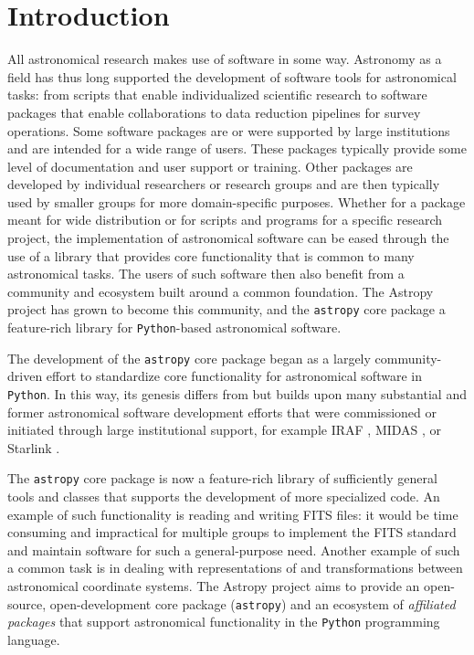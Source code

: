 \documentclass[modern]{aastex61}
\newcommand{\package}[1]{\texttt{#1}\xspace}
\newcommand{\python}{\package{Python}}
\newcommand{\astropy}{Astropy\xspace}
\newcommand{\astropypkg}{\package{astropy}}
\begin{document}
\section{Introduction} \label{sec:intro}
All astronomical research makes use of software in some way.  Astronomy as a field has thus long supported the development of software tools
for astronomical tasks: from scripts that enable individualized scientific research to software packages that enable collaborations to data reduction pipelines for survey operations.
Some software packages are or were supported by large institutions and are intended for a wide range of users. These packages typically provide some level of documentation and user support or
training.
Other packages are developed by individual researchers or research groups and
are then typically used by smaller groups for more domain-specific purposes.
Whether for a package meant for wide distribution or for scripts and programs
for a specific research project, the implementation of astronomical software can
be eased through the use of a library that provides core functionality that is
common to many astronomical tasks.
The users of such software then also benefit from a community and ecosystem
built around a common foundation.
The \astropy project has grown to become this community, and the \astropypkg
core package a feature-rich library for \python-based astronomical software.

The development of the \astropypkg core package began as a largely
community-driven effort to standardize core functionality for astronomical
software in \python.
In this way, its genesis differs from but builds upon many substantial and
former astronomical software development efforts that were commissioned or
initiated through large institutional support, for example IRAF \citep[developed
at NOAO;][]{IRAF}, MIDAS \citep[developed at ESO;][]{MIDAS}, or Starlink
\citep[originally developed by a consortium of UK institutions and now
maintained by the East Asian Observatory;][]{starlink1982,starlink2013}.

The \astropypkg core package is now a feature-rich library of sufficiently
general tools and classes that supports the development of more specialized
code. An example of such functionality is reading and writing FITS files: it would be
time consuming and impractical for multiple groups to implement the FITS
standard \citep{FITS} and maintain software for such a general-purpose need.
Another example of such a common task is in dealing with representations of and
transformations between astronomical coordinate systems.
The \astropy project aims to provide an open-source, open-development core
package (\astropypkg) and an ecosystem of \emph{affiliated packages} that
support astronomical functionality in the \python programming language.
\end{document}
